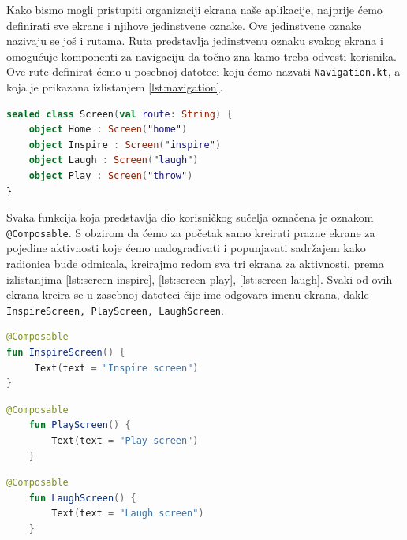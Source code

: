 \documentclass[11pt,a4paper,twoside]{article}
\begin{document}
Kako bismo mogli pristupiti organizaciji ekrana naše aplikacije, najprije ćemo definirati sve ekrane i njihove jedinstvene oznake. Ove jedinstvene oznake nazivaju se još i rutama. Ruta predstavlja jedinstvenu oznaku svakog ekrana i omogućuje komponenti za navigaciju da točno zna kamo treba odvesti korisnika. Ove rute definirat ćemo u posebnoj datoteci koju ćemo nazvati \texttt{Navigation.kt}, a koja je prikazana izlistanjem \ref{lst:navigation}.

\begin{lstlisting}[caption={Navigacija - Navigation.kt}, label={lst:navigation}, language=Kotlin]
sealed class Screen(val route: String) {
	object Home : Screen("home")
	object Inspire : Screen("inspire")
	object Laugh : Screen("laugh")
	object Play : Screen("throw")
}
\end{lstlisting}

Svaka funkcija koja predstavlja dio korisničkog sučelja označena je oznakom \texttt{@Composable}. S obzirom da ćemo za početak samo kreirati prazne ekrane za pojedine aktivnosti koje ćemo nadograđivati i popunjavati sadržajem kako radionica bude odmicala, kreirajmo redom sva tri ekrana za aktivnosti, prema izlistanjima \ref{lst:screen-inspire}, \ref{lst:screen-play}, \ref{lst:screen-laugh}. Svaki od ovih ekrana kreira se u zasebnoj datoteci čije ime odgovara imenu ekrana, dakle \texttt{InspireScreen, PlayScreen, LaughScreen}.

\begin{lstlisting}[caption={Inspirirajući ekran - InspireScreen.kt}, label={lst:screen-inspire}, language=Kotlin]
@Composable
fun InspireScreen() {
	 Text(text = "Inspire screen")
}
\end{lstlisting}
\begin{lstlisting}[caption={Zaigrani ekran - PlayScreen.kt}, label={lst:screen-play}, language=Kotlin]
	@Composable
	fun PlayScreen() {
		Text(text = "Play screen")
	}
\end{lstlisting}
\begin{lstlisting}[caption={Nasmijani ekran - LaughScreen.kt}, label={lst:screen-laugh}, language=Kotlin]
	@Composable
	fun LaughScreen() {
		Text(text = "Laugh screen")
	}
\end{lstlisting}
\end{document}
